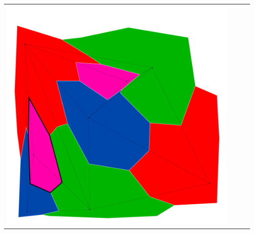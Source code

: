 \documentclass[10pt,a4paper]{article}
\begin{document}
\begin{tabular}{c c c c }
	\includegraphics[scale=.10]{../results/backtracking_forward/map_build/bt_forward_I00013.pdf}\\
\end{tabular}
\end{document}
